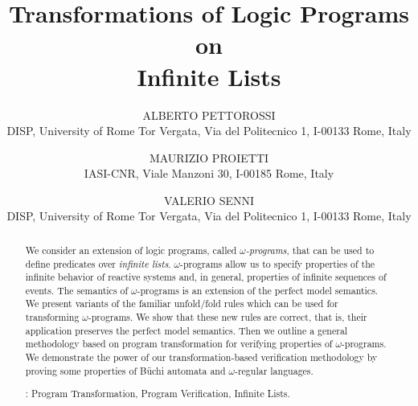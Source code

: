 \documentclass[english]{tlp}
\begin{document}
\thispagestyle{empty}

\long{}


\title[Transformations of Logic Programs on Infinite
Lists] {Transformations of Logic Programs on\\ Infinite Lists}

\author[A. Pettorossi, M. Proietti, and V. Senni]
{ALBERTO PETTOROSSI\\
DISP, University of Rome Tor Vergata,
Via del Politecnico 1, I-00133 Rome, Italy\\
 \and
MAURIZIO PROIETTI\\
IASI-CNR, Viale Manzoni 30, I-00185 Rome, Italy\\
 \and
VALERIO SENNI\\
DISP, University of Rome Tor Vergata,
Via del Politecnico 1, I-00133 Rome, Italy\\
 }

\pagerange{\pageref{firstpage}--\pageref{lastpage}}
  \setcounter{page}{1}

\maketitle

\label{firstpage}

\maketitle
\begin{abstract}
We consider an extension of logic
programs, called {\em $\omega$-programs}, that can be used to define predicates
over {\em infinite lists}. 
\mbox{$\omega$-programs} allow us to specify properties of the 
infinite behavior of
reactive systems and, in general, properties of infinite sequences of events. 
The  semantics of \mbox{$\omega$-programs} is
an extension of the perfect model semantics. 
We present variants of the familiar unfold/fold rules which can be
used for transforming $\omega$-programs. We show that these new rules are correct, that is,
their application preserves the perfect model semantics. 
Then we outline a general methodology based on program transformation
for verifying properties of $\omega$-programs.
We demonstrate the power of our transformation-based verification methodology
by proving some properties of B\"uchi automata and \mbox{$\omega$-regular} languages.

\smallskip

: Program Transformation, Program Verification, Infinite Lists.
\end{abstract}
\end{document}
